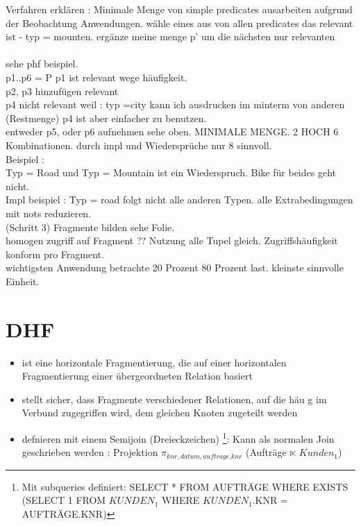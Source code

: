 \documentclass[a4paper,10pt,titlepage=false]{scrreprt}
\begin{document}
Verfahren erklären :
Minimale Menge von simple predicates ausarbeiten aufgrund der Beobachtung Anwendungen.
wähle eines aus von allen predicates das relevant ist - typ = mounten. 
ergänze meine menge p' um die nächsten nur relevanten \\ 
\\ sehe phf beispiel. \\
p1..p6 = P
p1 ist relevant wege häufigkeit.\\
p2, p3 hinzufügen  relevant \\
p4 nicht relevant weil : typ  =city kann ich ausdrucken im minterm von anderen (Restmenge) p4 ist aber einfacher zu 
benutzen.\\
entweder p5, oder p6 aufnehmen sehe oben. MINIMALE MENGE.
2 HOCH 6 Kombinationen. durch impl und Wiedersprüche nur 8 sinnvoll. \\
Beispiel : \\
Typ = Road und Typ = Mountain ist ein Wiederspruch. Bike für beides geht nicht.\\
Impl beispiel :
Typ = road folgt nicht alle anderen Typen. alle Extrabedingungen mit nots reduzieren. \\ (Schritt 3)
Fragmente bilden sehe Folie.\\
homogen zugriff auf Fragment ?? Nutzung alle Tupel gleich. Zugriffshäufigkeit konform pro Fragment. \\
wichtigsten Anwendung betrachte 20 Prozent 80 Prozent last.
kleinste sinnvolle Einheit. \\

\section{DHF}
\begin{itemize}
 \item ist eine horizontale Fragmentierung, die auf einer
horizontalen Fragmentierung einer übergeordneten
Relation basiert
\item stellt sicher, dass Fragmente verschiedener
Relationen, auf die häu g im Verbund zugegriffen
wird, dem gleichen Knoten zugeteilt werden
\item defnieren mit einem Semijoin (Dreieckzeichen) \footnote{Mit subqueries definiert: SELECT * FROM AUFTRÄGE WHERE 
EXISTS (SELECT 1  FROM $KUNDEN_1$ WHERE $KUNDEN_1$.KNR = AUFTRÄGE.KNR) }: Kann als normalen Join geschrieben werden :
Projektion $\pi_{knr,datum,auftrage.knr}$ (Aufträge $\ltimes $ $Kunden_1$) 

\end{itemize}
\end{document}
